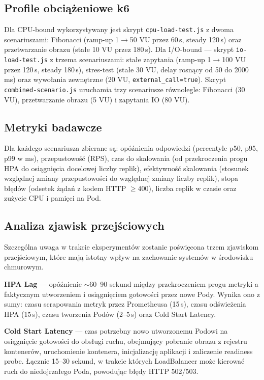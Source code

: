 \subsection{Profile obciążeniowe k6}

Dla CPU-bound wykorzystywany jest skrypt \texttt{cpu-load-test.js} z dwoma scenariuszami: Fibonacci (ramp-up 1$\rightarrow$50 VU przez 60\,s, steady 120\,s) oraz przetwarzanie obrazu (stałe 10 VU przez 180\,s). Dla I/O-bound --- skrypt \texttt{io-load-test.js} z trzema scenariuszami: stałe zapytania (ramp-up 1$\rightarrow$100 VU przez 120\,s, steady 180\,s), stres-test (stałe 30 VU, delay rosnący od 50 do 2000\,ms) oraz wywołania zewnętrzne (20 VU, \texttt{external\_call=true}). Skrypt \texttt{combined-scenario.js} uruchamia trzy scenariusze równolegle: Fibonacci (30 VU), przetwarzanie obrazu (5 VU) i zapytania IO (80 VU).

\subsection{Metryki badawcze}

Dla każdego scenariusza zbierane są: opóźnienia odpowiedzi (percentyle p50, p95, p99 w ms), przepustowość (RPS), czas do skalowania (od przekroczenia progu HPA do osiągnięcia docelowej liczby replik), efektywność skalowania (stosunek względnej zmiany przepustowości do względnej zmiany liczby replik), stopa błędów (odsetek żądań z kodem HTTP $\geq 400$), liczba replik w czasie oraz zużycie CPU i pamięci na Pod.

\subsection{Analiza zjawisk przejściowych}

Szczególna uwaga w trakcie eksperymentów zostanie poświęcona trzem zjawiskom przejściowym, które mają istotny wpływ na zachowanie systemów w środowisku chmurowym.

\textbf{HPA Lag} --- opóźnienie $\sim$60--90 sekund między przekroczeniem progu metryki a faktycznym utworzeniem i osiągnięciem gotowości przez nowe Pody. Wynika ono z sumy: czasu scrapowania metryk przez Prometheusa (15\,s), czasu odświeżenia HPA (15\,s), czasu tworzenia Podów (2--5\,s) oraz Cold Start Latency.

\textbf{Cold Start Latency} --- czas potrzebny nowo utworzonemu Podowi na osiągnięcie gotowości do obsługi ruchu, obejmujący pobranie obrazu z rejestru kontenerów, uruchomienie kontenera, inicjalizację aplikacji i zaliczenie readiness probe. Łącznie 15--30 sekund, w trakcie których LoadBalancer może kierować ruch do niedojrzałego Poda, powodując błędy HTTP 502/503.

